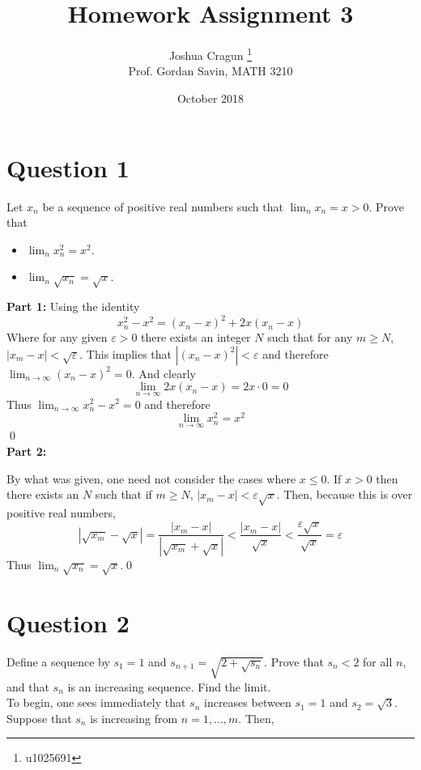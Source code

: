 \documentclass[12pt, letterpaper]{article}
\title{Homework Assignment 3}
\author{Joshua Cragun \thanks{u1025691} \\ Prof. Gordan Savin, MATH 3210}
\date{October 2018}
\begin{document}
\begin{titlepage}
\maketitle
\end{titlepage}

\pagebreak

\section*{Question 1}
Let $x_n$ be a sequence of positive real numbers such that $\lim_n x_n =x>0$. Prove that
\begin{itemize}
\item
$\lim_n x_n^2= x^2$.
\item
$\lim_n \sqrt{x_n}= \sqrt{x}$.
\end{itemize}

\noindent\textbf{Part 1:} Using the identity
$$ x_n^2 - x^2 = (x_n - x)^2 + 2x(x_n - x) $$
Where for any given $\varepsilon > 0$ there exists an integer $N$ such that for any $m \geq N$, $|x_m - x| < \sqrt{\varepsilon}$.
This implies that $|(x_n - x)^2| < \varepsilon$ and therefore $\lim_{n\to\infty} (x_n - x)^2 = 0$. And clearly
$$\lim_{n\to\infty} 2x(x_n - x) = 2x \cdot 0 = 0$$
Thus $\lim_{n\to\infty} x_n^2 - x^2 = 0$ and therefore
$$ \lim_{n\to\infty} x_n^2 = x^2 $$
\qed
\\
\noindent\textbf{Part 2:}

\noindent By what was given, one need not consider the cases where $x \leq 0$. If $x > 0$ then there exists an $N$ such that if $m \geq N$, $|x_m - x| < \varepsilon\sqrt{x}$. Then, because this is over positive real numbers,
$$ |\sqrt{x_m} - \sqrt{x}| = \frac{|x_m - x|}{|\sqrt{x_m} + \sqrt{x}|} < \frac{|x_m - x|}{\sqrt{x}} < \frac{\varepsilon\sqrt{x}}{\sqrt{x}} = \varepsilon $$
Thus $\lim_n \sqrt{x_n}= \sqrt{x}$.\qed

\pagebreak

\section*{Question 2}
Define a sequence by $s_1=1$ and $s_{n+1} = \sqrt{2+\sqrt{s_n}}$. Prove that $s_n <2$ for all $n$, and that $s_n$ is an increasing sequence. Find the limit.\\

\noindent To begin, one sees immediately that $s_n$ increases between $s_1 = 1$ and $s_2 = \sqrt{3}$. Suppose that $s_n$ is increasing from $n = 1, ..., m$. Then,
\end{document}
